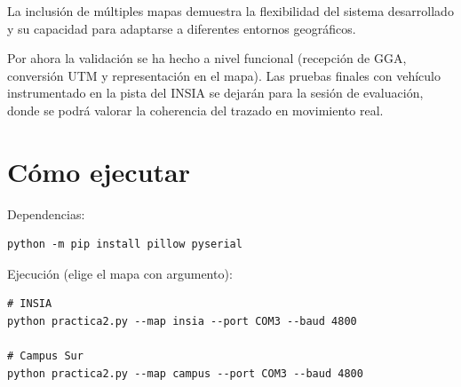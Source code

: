 \documentclass[10pt]{article}
\begin{document}
La inclusión de múltiples mapas demuestra la flexibilidad del sistema desarrollado y su capacidad para adaptarse a diferentes entornos geográficos.

Por ahora la validación se ha hecho a nivel funcional (recepción de GGA, conversión UTM y representación en el mapa). Las pruebas finales con vehículo instrumentado en la pista del INSIA se dejarán para la sesión de evaluación, donde se podrá valorar la coherencia del trazado en movimiento real.



\section{Cómo ejecutar}
Dependencias:
\begin{lstlisting}[style=pythonEstilo]
python -m pip install pillow pyserial
\end{lstlisting}

Ejecución (elige el mapa con argumento):
\begin{lstlisting}[style=pythonEstilo]
# INSIA
python practica2.py --map insia --port COM3 --baud 4800

# Campus Sur
python practica2.py --map campus --port COM3 --baud 4800
\end{lstlisting}
\end{document}
